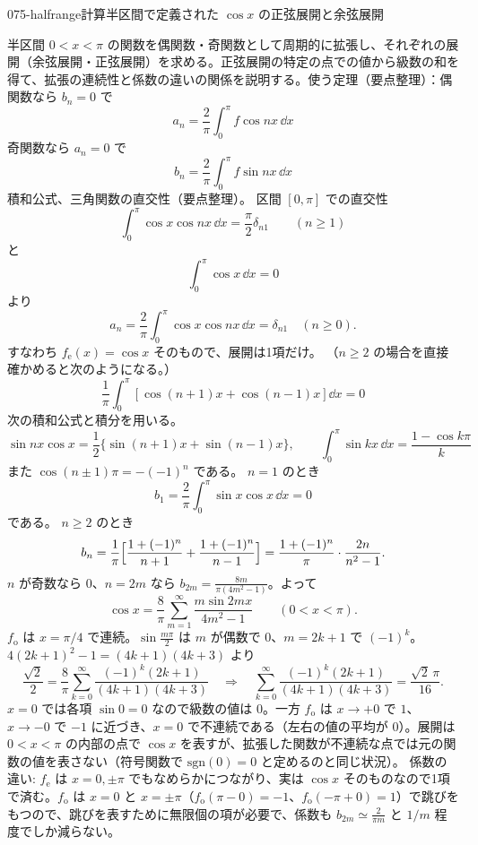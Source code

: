 \documentclass[uplatex,dvipdfmx,a4paper,11pt]{jsarticle}
\begin{document}
\begin{mondai}{075-halfrange}{計算}{半区間で定義された $\cos x$ の正弦展開と余弦展開}
\begin{kizuki}
\end{kizuki}
\begin{tadashii}
\houshin 半区間 $0<x<\pi$ の関数を偶関数・奇関数として周期的に拡張し、それぞれの展開（余弦展開・正弦展開）を求める。正弦展開の特定の点での値から級数の和を得て、拡張の連続性と係数の違いの関係を説明する。使う定理（要点整理）：偶関数なら $b_n=0$ で
\[
a_n=\frac{2}{\pi}\int_{0}^{\pi}f\cos nx\,\dd x
\]
奇関数なら $a_n=0$ で
\[
b_n=\frac{2}{\pi}\int_{0}^{\pi}f\sin nx\,\dd x
\]
積和公式、三角関数の直交性（要点整理）。 %
\keisan
{} 区間 $[0,\pi]$ での直交性
\[
\int_0^{\pi}\cos x\cos nx\,\dd x=\frac{\pi}{2}\delta_{n1}\qquad(n\ge1)
\]
と
\[
\int_0^{\pi}\cos x\,\dd x=0
\]
より
\[
a_n=\frac{2}{\pi}\int_{0}^{\pi}\cos x\cos nx\,\dd x=\delta_{n1}\quad(n\ge0).
\]
すなわち $f_{\mathrm{e}}(x)=\cos x$ そのもので、展開は1項だけ。
（$n\ge2$ の場合を直接確かめると次のようになる。）
\[
\frac{1}{\pi}\int_0^{\pi}[\cos(n+1)x+\cos(n-1)x]\dd x=0
\]
 次の積和公式と積分を用いる。
\[
\sin nx\cos x=\frac{1}{2}\{\sin(n+1)x+\sin(n-1)x\},\qquad \int_0^{\pi}\sin kx\,\dd x=\frac{1-\cos k\pi}{k}
\]
また $\cos(n\pm1)\pi=-(-1)^{n}$ である。
$n=1$ のとき
\[
b_1=\frac{2}{\pi}\int_0^{\pi}\sin x\cos x\,\dd x=0
\]
である。
$n\ge2$ のとき
\[
b_n=\frac{1}{\pi}\Bigl[\frac{1+(-1)^{n}}{n+1}+\frac{1+(-1)^{n}}{n-1}\Bigr]=\frac{1+(-1)^{n}}{\pi}\cdot\frac{2n}{n^{2}-1}.
\]
$n$ が奇数なら $0$、$n=2m$ なら $b_{2m}=\frac{8m}{\pi(4m^{2}-1)}$。よって
\[
\cos x=\frac{8}{\pi}\sum_{m=1}^{\infty}\frac{m\sin2mx}{4m^{2}-1}\qquad(0<x<\pi).
\]
 $f_{\mathrm{o}}$ は $x=\pi/4$ で連続。$\sin\frac{m\pi}{2}$ は $m$ が偶数で $0$、$m=2k+1$ で $(-1)^{k}$。$4(2k+1)^{2}-1=(4k+1)(4k+3)$ より
\[
\frac{\sqrt{2}}{2}=\frac{8}{\pi}\sum_{k=0}^{\infty}\frac{(-1)^{k}(2k+1)}{(4k+1)(4k+3)}
\quad\Longrightarrow\quad
\sum_{k=0}^{\infty}\frac{(-1)^{k}(2k+1)}{(4k+1)(4k+3)}=\frac{\sqrt{2}\,\pi}{16}.
\]
 $x=0$ では各項 $\sin0=0$ なので級数の値は $0$。一方 $f_{\mathrm{o}}$ は $x\to+0$ で $1$、$x\to-0$ で $-1$ に近づき、$x=0$ で不連続である（左右の値の平均が $0$）。展開は $0<x<\pi$ の内部の点で $\cos x$ を表すが、拡張した関数が不連続な点では元の関数の値を表さない（符号関数で $\mathrm{sgn}(0)=0$ と定めるのと同じ状況）。
係数の違い: $f_{\mathrm{e}}$ は $x=0,\pm\pi$ でもなめらかにつながり、実は $\cos x$ そのものなので1項で済む。$f_{\mathrm{o}}$ は $x=0$ と $x=\pm\pi$（$f_{\mathrm{o}}(\pi-0)=-1$、$f_{\mathrm{o}}(-\pi+0)=1$）で跳びをもつので、跳びを表すために無限個の項が必要で、係数も $b_{2m}\simeq\frac{2}{\pi m}$ と $1/m$ 程度でしか減らない。

\end{tadashii}
\end{mondai}
\end{document}
